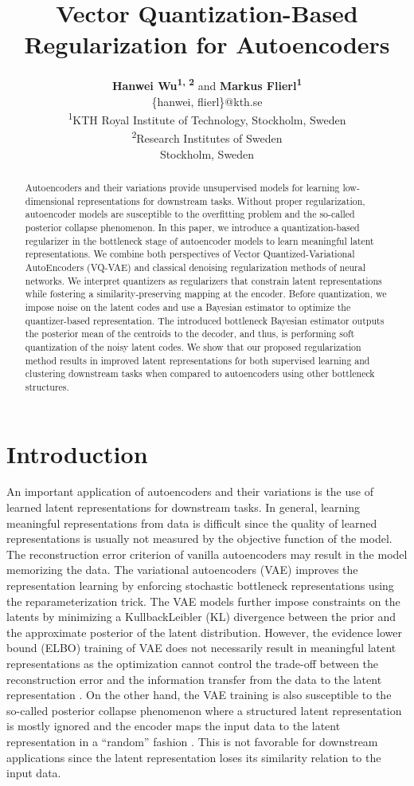 \documentclass[letterpaper]{article} %
\title{Vector Quantization-Based Regularization for Autoencoders}
\author{\large \textbf{Hanwei Wu\textsuperscript{\rm 1, 2}} and
\textbf{Markus Flierl\textsuperscript{\rm 1}} \\
\{hanwei, flierl\}@kth.se \\
\textsuperscript{\rm 1}KTH Royal Institute of Technology, Stockholm, Sweden\\
\textsuperscript{\rm 2}Research Institutes of Sweden\\
Stockholm, Sweden}
\begin{document}
\maketitle
\begin{abstract}
Autoencoders and their variations provide unsupervised models for learning low-dimensional representations for downstream tasks. Without proper regularization, autoencoder models are susceptible to the overfitting problem and the so-called posterior collapse phenomenon. In this paper, we introduce a quantization-based regularizer in the bottleneck stage of autoencoder models to learn meaningful latent representations. We combine both perspectives of Vector Quantized-Variational AutoEncoders (VQ-VAE) and classical denoising regularization methods of neural networks. We interpret quantizers as regularizers that constrain latent representations while fostering a similarity-preserving mapping at the encoder. Before quantization, we impose noise on the latent codes and use a Bayesian estimator to optimize the quantizer-based representation. The introduced bottleneck Bayesian estimator outputs the posterior mean of the centroids to the decoder, and thus, is performing soft quantization of the noisy latent codes. We show that our proposed regularization method results in improved latent representations for both supervised learning and clustering downstream tasks when compared to autoencoders using other bottleneck structures.
\end{abstract}
\section{Introduction}
An important application of autoencoders and their variations is the use of learned latent representations for downstream tasks. In general, learning meaningful representations from data is difficult since the quality of learned representations is usually not measured by the objective function of the model. The reconstruction error criterion of vanilla autoencoders may result in the model memorizing the data. The variational autoencoders (VAE) \cite{kingma:14:iclr} improves the representation learning by enforcing stochastic bottleneck representations using the reparameterization trick. The VAE models further impose constraints on the latents by minimizing a KullbackLeibler (KL) divergence between the prior and the approximate posterior of the latent distribution. However, the evidence lower bound (ELBO) training of VAE does not necessarily result in meaningful latent representations as the optimization cannot control the trade-off between the reconstruction error and the information transfer from the data to the latent representation \cite{pmlr-v80-alemi18a}. On the other hand, the VAE training is also susceptible to the so-called posterior collapse phenomenon where a structured latent representation is mostly ignored and the encoder maps the input data to the latent representation in a ``random'' fashion \cite{Lucas2019}. This is not favorable for downstream applications since the latent representation loses its similarity relation to the input data.
\end{document}

